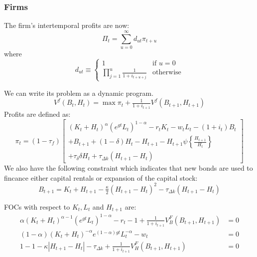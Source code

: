 \documentclass[letterpaper,12pt]{article}
\theoremstyle{definition}
\numberwithin{equation}{section}
\begin{document}
\begin{spacing}{1.5}
    \subsubsection{Firms}
      The firm's intertemporal profits are now:
      \begin{equation} \label{Macro_CorpTax_LifeProf}
      \Pi_t = \sum_{u=0}^\infty d_{ut}\pi_{t+u} \nonumber
      \end{equation}
      where
      \begin{equation}
      d_{ut} \equiv \left\{\begin{matrix} 1 & \text{if } u = 0 \label{Macro_CorpTax_DiscFact}\\
                                \prod_{j=1}^u \tfrac{1}{1+i_{t+u+j}} & \text{otherwise} \end{matrix} \right. \nonumber
      \end{equation}

      We can write its problem as a dynamic program.
      \begin{equation} \label{Macro_CorpTax_FirmDynProg}
      V^f(B_t,H_t) = \max \pi_t + \tfrac{1}{1+i_{t+1}} V^f(B_{t+1},H_{t+1}) \nonumber
      \end{equation}
      Profits are defined as: 
      \begin{equation} \label{Macro_CorpTax_Profit}
      \pi_t = (1-\tau_f)\begin{bmatrix} (K_t+H_t)^\alpha(e^{gt}L_t)^{1-\alpha} - r_t K_t - w_t L_t - (1+i_t) B_t \\
                                + B_{t+1} + (1-\delta) H_t - H_{t+1} - H_{t+1}\psi\left\{\tfrac{H_{t+1}}{H_{t}} \right\} \\
                                + \tau_\delta \delta H_t + \tau_{\Delta k} (H_{t+1} - H_t)\end{bmatrix} 
      \end{equation}
      We also have the following constraint which indicates that new bonds are used to fincance either capital rentals or expansion of the capital stock:
      \begin{equation}
      B_{t+1} = K_t + H_{t+1} - \tfrac{\kappa}{2}(H_{t+1}-H_t)^2 - \tau_{\Delta k} (H_{t+1} - H_t) \nonumber
      \end{equation}

      FOCs with respect to $K_t, L_t$ and $H_{t+1}$ are:
      \begin{align}
      \alpha (K_t+H_t)^{\alpha-1}(e^{gt}L_t)^{1-\alpha} - r_t - 1 +\tfrac{1}{1+i_{t+1}}V^F_B(B_{t+1},H_{t+1}) & = 0 \nonumber \\  
      (1-\alpha) (K_t+H_t)^{-\alpha}e^{(1-\alpha)gt}L_t^{-\alpha} - w_t & = 0 \nonumber \\
      1 -1 - \kappa \left|H_{t+1} - H_{t} \right| - \tau_{\Delta k} +\tfrac{1}{1+i_{t+1}}V^F_H(B_{t+1},H_{t+1}) & = 0 \nonumber  
      \end{align}


\end{spacing}
\end{document}
